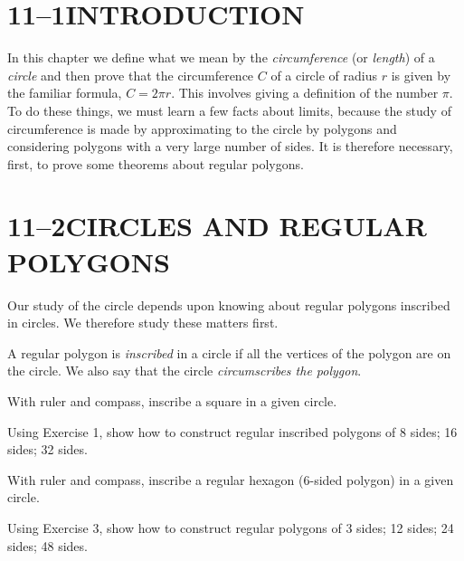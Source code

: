\documentclass[11pt]{book}
\theoremstyle{bkplain}
\theoremstyle{XIplainnote}
\theoremstyle{bkplain}
\theoremstyle{bkplain}
\begin{document}
\section*{11--1\quad INTRODUCTION}

In this chapter we define what we mean by the \emph{circumference} (or
\emph{length}) of a \emph{circle} and then prove that the circumference $C$ of
a circle of radius $r$ is given by the familiar formula, $C = 2\pi r$. This
involves giving a definition of the number $\pi$. To do these things, we must
learn a few facts about limits, because the study of circumference is made by
approximating to the circle by polygons and considering polygons with a very
large number of sides. It is therefore necessary, first, to prove some theorems
about regular polygons.

\section*{11--2\quad CIRCLES AND REGULAR POLYGONS}

Our study of the circle depends upon knowing about regular polygons inscribed
in circles. We therefore study these matters first.

\begin{definition}
A regular polygon is \emph{inscribed} in a circle if all the vertices of the
polygon are on the circle. We also say that the circle \emph{circumscribes the
polygon}.
\end{definition}

\begin{exercisecols}
\begin{exlist}
\item With ruler and compass, inscribe a square in a given circle.
\item Using Exercise 1, show how to construct regular inscribed polygons of
      8 sides; 16 sides; 32 sides.
\item With ruler and compass, inscribe a regular hexagon (6-sided polygon) in
      a given circle.
\item Using Exercise 3, show how to construct regular polygons of 3 sides;
      12 sides; 24 sides; 48 sides.
\end{exlist}
\end{exercisecols}
\end{document}
